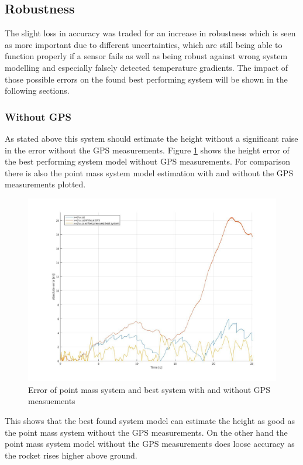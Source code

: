 \subsection{Robustness}
The slight loss in accuracy was traded for an increase in robustness which is seen as more important due to different uncertainties,
which are still being able to function properly if a sensor fails as well as being robust against wrong system modelling
and especially falsely detected temperature gradients. The impact of those possible errors on the found best performing system will be shown in the following sections.

\subsubsection{Without GPS}
As stated above this system should estimate the height without a significant raise in the error without the GPS measurements.
Figure \ref{fig:ErrorWitoutGPS} shows the height error of the best performing system model without GPS measurements.
For comparison there is also the point mass system model estimation with and without the GPS measurements plotted.

\begin{figure}[h!]
 \centering
 \includegraphics[width=.8\textwidth]{./Pictures/ErrorPointMassBestSystemWithoutGPS.jpg}
 \caption{Error of point mass system and best system with and without GPS measuements}
 \label{fig:ErrorWitoutGPS}
\end{figure}

This shows that the best found system model can estimate the height as good as the point mass system without the GPS measurements.
On the other hand the point mass system model without the GPS measurements does loose accuracy as the rocket rises higher above ground.

